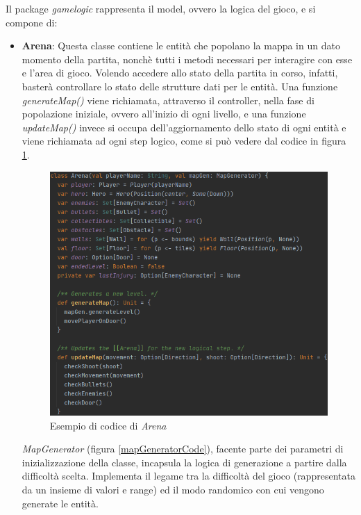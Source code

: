 Il package \textit{gamelogic} rappresenta il model, ovvero la logica del gioco, e si compone di:

\begin{itemize}
    \item \textbf{Arena}: Questa classe contiene le entità che popolano la mappa in un dato momento della partita, nonchè tutti i metodi necessari per interagire con esse e l'area di gioco. Volendo accedere allo stato della partita in corso, infatti, basterà controllare lo stato delle strutture dati per le entità. Una funzione \textit{generateMap()} viene richiamata, attraverso il controller, nella fase di popolazione iniziale, ovvero all'inizio di ogni livello, e una funzione \textit{updateMap()} invece si occupa dell'aggiornamento dello stato di ogni entità e viene richiamata ad ogni step logico, come si può vedere dal codice in figura \ref{arenaCode}.
    
    \begin{figure}[H]
        \includegraphics[width=15cm]{res/arenaCode.png}
        \caption{Esempio di codice di \textit{Arena}}
        \label{arenaCode}
    \end{figure}
    
    \textit{MapGenerator} (figura \ref{mapGeneratorCode}), facente parte dei parametri di inizializzazione della classe, incapsula la logica di generazione a partire dalla difficoltà scelta. Implementa il legame tra la difficoltà del gioco (rappresentata da un insieme di valori e range) ed il modo randomico con cui vengono generate le entità.
    

\end{itemize}

